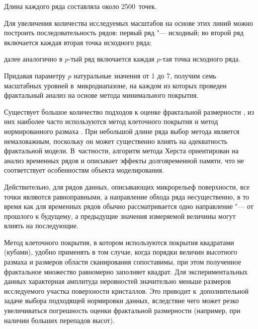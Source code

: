 Длина каждого ряда составляла около 2500~точек. 

Для увеличения количества исследуемых масштабов на основе этих линий можно построить последовательность рядов: первый ряд "--- исходный; во второй ряд включается каждая вторая точка исходного ряда; 

далее аналогично в $p$-тый ряд включается каждая $p$-тая точка исходного ряда. 

Придавая параметру $p$ натуральные значения от 1 до 7, получим семь масштабных уровней в~микродиапазоне, на каждом из которых проведен фрактальный анализ на основе метода минимального покрытия.



\smallskip




Существует большое количество подходов к оценке фрактальной размерности \cite{l17,l25,l26}, из них наиболее часто используются метод клеточного покрытия \cite{l7} и метод нормированного размаха \cite{l15,l24}. При небольшой длине ряда выбор метода является немаловажным, поскольку он может существенно влиять на адекватность фрактальной модели. В~частности, алгоритм метода Херста ориентирован на анализ временных рядов и описывает эффекты долговременной памяти, что не соответствует особенностям объекта моделирования. 

Действительно, для рядов данных, описывающих микрорельеф поверхности, все точки являются равноправными, а направление обхода ряда несущественно, в то время как для временных рядов обычно рассматривается одно направление "--- от прошлого к будущему, а предыдущие значения измеряемой величины могут влиять на последующие. 

  

  Метод клеточного покрытия, в котором используются покрытия квадратами (кубами), удобно применять в том случае, когда порядки величин высотного размаха и размеров области сканирования сопоставимы, при этом полученное фрактальное множество равномерно заполняет квадрат. Для экспериментальных данных характерная амплитуда неровностей значительно меньше размеров исследуемого участка поверхности кристаллов. Это приводит к~дополнительной задаче выбора подходящей нормировки данных, вследствие чего может резко увеличиваться погрешность оценки фрактальной размерности (например, при наличии больших перепадов высот).

  

